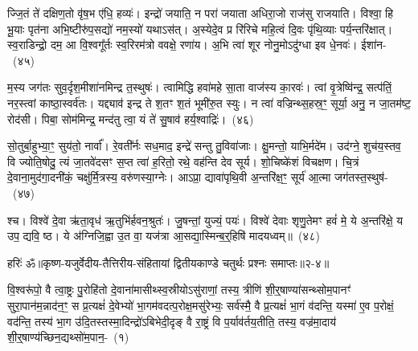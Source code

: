 ज्जि॒तं ते॑ दक्षिण॒तो वृ॑ष॒भ ए॑धि॒ हव्यः॑। इन्द्रो॑ जयाति॒ न परा॑ जयाता अधिरा॒जो राज॑सु राजयाति। विश्वा॒ हि भू॒याः पृत॑ना अभि॒ष्टीरु॑प॒सद्यो॑ नम॒स्यो॑ यथा\-ऽ\-स॑त्। अ॒स्येदे॒व प्र रि॑रिचे महि॒त्वं दि॒वः पृ॑थि॒व्याः पर्य॒न्तरि॑क्षात्। स्व॒राडिन्द्रो॒ दम॒ आ वि॒श्वगू᳚र्तः स्व॒रिरम॑त्रो ववक्षे॒ रणा॑य। अ॒भि त्वा॑ शूर नोनु॒मो\-ऽदु॑ग्धा इव धे॒नवः॑। ईशा॑न-~(४५)\ip

म॒स्य जग॑तः सुव॒र्दृश॒मीशा॑नमिन्द्र त॒स्थुषः॑। त्वामिद्धि हवा॑महे सा॒ता वाज॑स्य का॒रवः॑। त्वां वृ॒त्रेष्वि॑न्द्र॒ सत्प॑तिं॒ नर॒स्त्वां काष्ठा॒स्वर्व॑तः। यद्द्याव॑ इन्द्र ते श॒तꣳ श॒तं भूमी॑रु॒त स्युः। न त्वा॑ वज्रिन्थ्स॒हस्र॒ꣳ॒ सूर्या॒ अनु॒ न जा॒तम॑ष्ट॒ रोद॑सी। पिबा॒ सोम॑मिन्द्र॒ मन्द॑तु त्वा॒ यं ते॑ सु॒षाव॑ हर्य॒श्वाद्रिः॑।~(४६)\ip

सो॒तुर्बा॒हुभ्या॒ꣳ॒ सुय॑तो॒ नार्वा᳚। रे॒वती᳚र्नः सध॒माद॒ इन्द्रे॑ सन्तु तु॒विवा॑जाः। क्षु॒मन्तो॒ याभि॒र्मदे॑म। उद॑ग्ने॒ शुच॑य॒स्तव॒ वि ज्योति॒षोदु॒ त्यं जा॒तवे॑दसꣳ स॒प्त त्वा॑ ह॒रितो॒ रथे॒ वह॑न्ति देव सूर्य। शो॒चिष्के॑शं विचक्षण। चि॒त्रं दे॒वाना॒मुद॑गा॒दनी॑कं॒ चक्षु॑र्मि॒त्रस्य॒ वरु॑णस्या॒ग्नेः। आ\-ऽप्रा॒ द्यावा॑\-पृथि॒वी अ॒न्तरि॑क्ष॒ꣳ॒ सूर्य॑ आ॒त्मा जग॑तस्त॒स्थुष॑-~(४७)\ip

श्च। विश्वे॑ दे॒वा ऋ॑ता॒वृध॑ ऋ॒तुभि॑र्\mbox{}हवन॒श्रुतः॑। जु॒षन्तां॒ युज्यं॒ पयः॑। विश्वे॑ देवाः शृणु॒तेमꣳ हवं॑ मे॒ ये अ॒न्तरि॑क्षे॒ य उप॒ द्यवि॒ ष्ठ। ये अ॑ग्निजि॒ह्वा उ॒त वा॒ यज॑त्रा आ॒सद्या॒स्मिन्ब॒र्॒\mbox{}हिषि॑ मादयध्वम्॥~(४८)\ip

{\anuvakamend[{तदीशा॑न॒मद्रि॑स्त॒स्थुष॑स्त्रि॒ꣳ॒शच्च॑}]}%

{हरिः॑ ॐ}{॥कृष्ण-यजुर्वेदीय-तैत्तिरीय-संहितायां द्वितीयकाण्डे चतुर्थः प्रश्नः समाप्तः॥२-४॥}

\setcounter{anuvakam}{0}
वि॒श्वरू॑पो॒ वै त्वा॒ष्ट्रः पु॒रोहि॑तो दे॒वाना॑मासीथ्स्व॒स्रीयो\-ऽसु॑राणां॒ तस्य॒ त्रीणि॑ शी॒र्॒\mbox{}षाण्या॑सन्थ्सोम॒पानꣳ॑ सुरा॒पान॑म॒न्नाद॑न॒ꣳ॒ स प्र॒त्यक्षं॑ दे॒वेभ्यो॑ भा॒गम॑वदत्प॒रोक्ष॒मसु॑रेभ्यः॒ सर्व॑स्मै॒ वै प्र॒त्यक्षं॑ भा॒गं व॑दन्ति॒ यस्मा॑ ए॒व प॒रोक्षं॒ वद॑न्ति॒ तस्य॑ भा॒ग उ॑दि॒तस्तस्मा॒दिन्द्रो॑\-ऽबिभेदी॒दृङ् वै रा॒ष्ट्रं वि प॒र्याव॑र्तय॒तीति॒ तस्य॒ वज्र॑मा॒दाय॑ शी॒र्॒\mbox{}षाण्य॑च्छिन॒द्यथ्सो॑म॒पान॒-~(१)\ip

